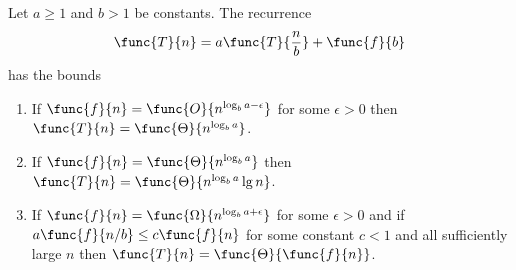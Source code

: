 \begin{theorem}
    Let \(a \geq 1\) and \(b > 1\) be constants. The recurrence
    \begin{equation*}
        \func{T}{n} = a \func{T}{\frac{n}{b}} + \func{f}{b}
    \end{equation*}
    has the bounds
    \begin{enumerate}
        \item If \(\func{f}{n} = \func{O}{n^{\log_b a - \epsilon}}\) for some \(\epsilon > 0\) then \(\func{T}{n} = \func{\Theta}{n^{\log_b a }}\).
        \item If \(\func{f}{n} = \func{\Theta}{n^{\log_b a}}\) then \(\func{T}{n} = \func{\Theta}{n^{\log_b a } \lg n}\).
        \item If \(\func{f}{n} = \func{\Omega}{n^{\log_b a + \epsilon}}\) for some \(\epsilon > 0\) and if \(a\func{f}{n/b} \leq c \func{f}{n}\) for some constant \(c < 1\) and all sufficiently large \(n\) then \(\func{T}{n} = \func{\Theta}{\func{f}{n}}\).
    \end{enumerate}
\end{theorem}
